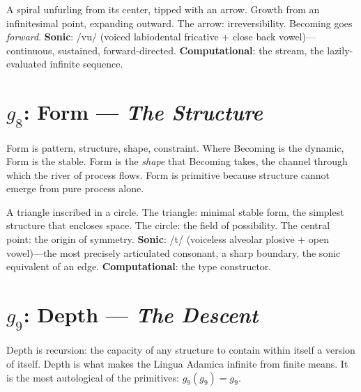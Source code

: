 \documentclass[12pt, letterpaper]{book}
\def\equiv{=}%
\def\mathfrak#1{#1}%
\newcommand{\self}[1]{#1(#1)}                      %
\begin{document}
A spiral unfurling from its center, tipped with an arrow. Growth from an infinitesimal point, expanding outward. The arrow: irreversibility. Becoming goes \textit{forward}. \textbf{Sonic}: /vu/ (voiced labiodental fricative + close back vowel)---continuous, sustained, forward-directed. \textbf{Computational}: the stream, the lazily-evaluated infinite sequence.



\section{$\mathfrak{g}_8$: Form --- \textit{The Structure}}

Form is pattern, structure, shape, constraint. Where Becoming is the dynamic, Form is the stable. Form is the \textit{shape} that Becoming takes, the channel through which the river of process flows. Form is primitive because structure cannot emerge from pure process alone.

\begin{center}
\end{center}

A triangle inscribed in a circle. The triangle: minimal stable form, the simplest structure that encloses space. The circle: the field of possibility. The central point: the origin of symmetry. \textbf{Sonic}: /t\textscripta/ (voiceless alveolar plosive + open vowel)---the most precisely articulated consonant, a sharp boundary, the sonic equivalent of an edge. \textbf{Computational}: the type constructor.



\section{$\mathfrak{g}_9$: Depth --- \textit{The Descent}}

Depth is recursion: the capacity of any structure to contain within itself a version of itself. Depth is what makes the Lingua Adamica infinite from finite means. It is the most autological of the primitives: $\self{\mathfrak{g}_9} \equiv \mathfrak{g}_9$.
\end{document}
